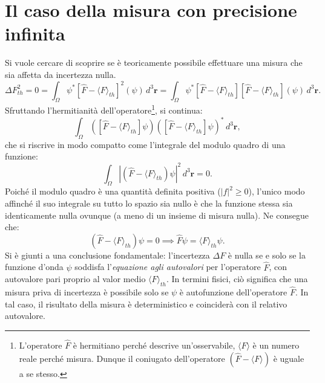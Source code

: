 \documentclass[a4paper,11pt]{report}
\begin{document}
\section{Il caso della misura con precisione infinita}
Si vuole cercare di scoprire se è teoricamente possibile effettuare una misura che sia affetta da incertezza nulla. 
\begin{equation}
\Delta F_{th}^2 = 0 = \int_\Omega \psi^* [\hat{F}-\langle F \rangle_{th}]^2(\psi) \, d^3\bm{r} = \int_\Omega \psi^* [\hat{F}-\langle F \rangle_{th}][\hat{F}-\langle F \rangle_{th}](\psi) \, d^3\bm{r}.
\end{equation}
Sfruttando l'hermitianità dell'operatore\footnote{L'operatore $\hat{F}$ è hermitiano perché descrive un'osservabile, $\langle F \rangle$ è un numero reale perché misura. Dunque il coniugato dell'operatore $(\hat{F} - \langle F \rangle)$ è uguale a se stesso.}, si continua:
\begin{equation}
\int_\Omega ([\hat{F}-\langle F \rangle_{th}]\psi)([\hat{F}-\langle F \rangle_{th}]\psi)^* \, d^3\bm{r},
\end{equation}
che si riscrive in modo compatto come l'integrale del modulo quadro di una funzione:
\begin{equation}
    \int_\Omega \left| (\hat{F} - \langle F \rangle_{th})\psi \right|^2 \, d^3\bm{r} = 0.
\end{equation}
Poiché il modulo quadro è una quantità definita positiva ($|f|^2 \geq 0$), l'unico modo affinché il suo integrale su tutto lo spazio sia nullo è che la funzione stessa sia identicamente nulla ovunque (a meno di un insieme di misura nulla). Ne consegue che:
\begin{equation}
    (\hat{F} - \langle F \rangle_{th})\psi = 0 \implies \hat{F}\psi = \langle F \rangle_{th}\psi.
\end{equation}
Si è giunti a una conclusione fondamentale: l'incertezza $\Delta F$ è nulla se e solo se la funzione d'onda $\psi$ soddisfa l'\textit{equazione agli autovalori} per l'operatore $\hat{F}$, con autovalore pari proprio al valor medio $\langle F \rangle_{th}$.
In termini fisici, ciò significa che una misura priva di incertezza è possibile solo se $\psi$ è autofunzione dell'operatore $\hat{F}$. In tal caso, il risultato della misura è deterministico e coinciderà con il relativo autovalore.
\end{document}
